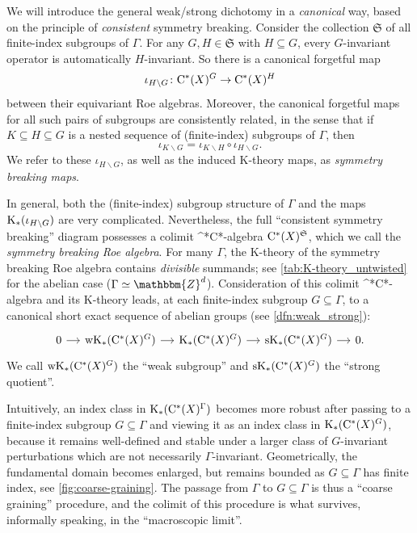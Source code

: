 \documentclass{amsart}
\numberwithin{figure}{section}
\numberwithin{equation}{section}
\numberwithin{table}{section}
\theoremstyle{plain}
\theoremstyle{definition}
\theoremstyle{remark}
\theoremstyle{nonumber}
\newcommand{\Z}{\mathbb{Z}}
\newcommand{\K}{\relax\ifmmode\operatorname{K}\else\textup{K}\fi}
\newcommand{\Cst}{\relax\ifmmode\mathrm{C}^*\else\textup{C*}\fi}
\renewcommand{\mathbb}{\mathbbm} %
\begin{document}
We will introduce the general weak/strong dichotomy in a \emph{canonical} way, based on the principle of \emph{consistent} symmetry
breaking. 
Consider the collection \( \mathfrak{S} \)
of all finite-index subgroups
of $\Gamma$. For any \( G,H\in\mathfrak{S} \) with \( H\subseteq
G \), every $G$-invariant operator is automatically $H$-invariant. So there
is a canonical forgetful map
\[ 
\iota_{H\backslash G}\colon \Cst(X)^G\to\Cst(X)^H
\]
between their equivariant Roe algebras. Moreover, the canonical forgetful
maps for all such pairs of subgroups
are consistently related, in the sense that if \( K\subseteq H\subseteq G
\) is a nested sequence of (finite-index) subgroups of \( \Gamma \), then
\[ 
  \iota_{K\backslash G}=\iota_{K\backslash H}\circ\iota_{H\backslash
  G}.
\] 
We refer to these \( \iota_{H\backslash G} \), as well as the
induced K-theory maps, as \emph{symmetry breaking maps}. 

In general, both the (finite-index)
subgroup structure of $\Gamma$ and the maps $\K_*(\iota_{H\backslash G})$ are very complicated. Nevertheless, the full ``consistent symmetry
breaking'' diagram possesses a colimit \Cst-algebra \(
\Cst(X)^\mathfrak{S} \), which we call the \emph{symmetry breaking Roe
algebra}. For many \( \Gamma \), the K-theory of the symmetry breaking Roe
algebra contains \emph{divisible} summands; see
\cref{tab:K-theory_untwisted} for the abelian case 
(\( \Gamma\simeq\Z^d \)). 
Consideration of this colimit \Cst-algebra and its K-theory 
leads, at each finite-index subgroup $G\subseteq\Gamma$, to a
canonical short exact sequence of abelian groups (see \cref{dfn:weak_strong}):
\begin{equation}\label{eq:informal.weak.strong}
\begin{tikzcd}[column sep=small]
0\arrow[r] & {\rm wK}_*(\Cst(X)^G) \arrow[r] & \K_*(\Cst(X)^G)
\arrow[r] & {\rm sK}_*(\Cst(X)^G) \arrow[r] & 0.
\end{tikzcd}
\end{equation}
We call ${\rm wK}_*(\Cst(X)^G)$ the ``weak subgroup'' and ${\rm
sK}_*(\Cst(X)^G)$ the ``strong quotient''. 

Intuitively, an index class in $\K_*(\Cst(X)^\Gamma)$ becomes more robust after passing to a finite-index subgroup \(
G\subseteq \Gamma \) and viewing it as an index class in \( \K_*(\Cst(X)^G) \), because it remains
well-defined and stable under a larger class of $G$-invariant
perturbations which are not necessarily $\Gamma$-invariant.
Geometrically, the fundamental domain becomes enlarged, but remains bounded
as $G\subseteq \Gamma$ has finite index, see \cref{fig:coarse-graining}.
The passage from $\Gamma$ to $G\subseteq\Gamma$ is thus a ``coarse
graining'' procedure, and the colimit of this procedure is what survives,
informally speaking, in the ``macroscopic limit''. 
\end{document}
